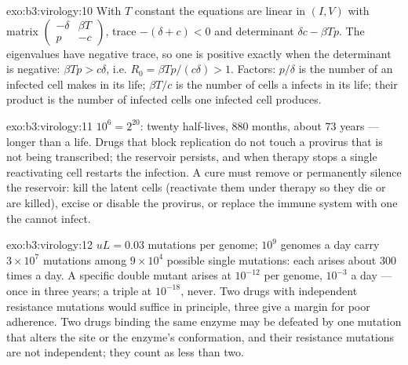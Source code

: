 \begin{solution}{exo:b3:virology:10}
With $T$ constant the equations are linear in $(I, V)$ with matrix
$\begin{pmatrix} -\delta & \beta T \\ p & -c \end{pmatrix}$, trace
$-(\delta + c) < 0$ and determinant $\delta c - \beta Tp$. The
eigenvalues have negative trace, so one is positive exactly when the
determinant is negative: $\beta Tp > c\delta$, i.e. $R_{0} = \beta
Tp/(c\delta) > 1$. Factors: $p/\delta$ is the number of  an
infected cell makes in its life; $\beta T/c$ is the number of cells a
 infects in its life; their product is the number of infected
cells one infected cell produces.
\end{solution}

\begin{solution}{exo:b3:virology:11}
$10^{6} = 2^{20}$: twenty half-lives, $880$ months, about $73$ years ---
longer than a life. Drugs that block replication do not touch a
provirus that is not being transcribed; the reservoir persists, and when
therapy stops a single reactivating cell restarts the infection. A cure
must remove or permanently silence the reservoir: kill the latent cells
(reactivate them under therapy so they die or are killed), excise or
disable the provirus, or replace the immune system with one the 
cannot infect.
\end{solution}

\begin{solution}{exo:b3:virology:12}
$uL = 0.03$ mutations per genome; $10^{9}$ genomes a day carry $3\times
10^{7}$ mutations among $9\times 10^{4}$ possible single mutations: each
arises about $300$ times a day. A specific double mutant arises at
$10^{-12}$ per genome, $10^{-3}$ a day --- once in three years; a
triple at $10^{-18}$, never. Two drugs with independent resistance
mutations would suffice in principle, three give a margin for poor
adherence. Two drugs binding the same enzyme may be defeated by one
mutation that alters the site or the enzyme's conformation, and their
resistance mutations are not independent; they count as less than two.
\end{solution}

